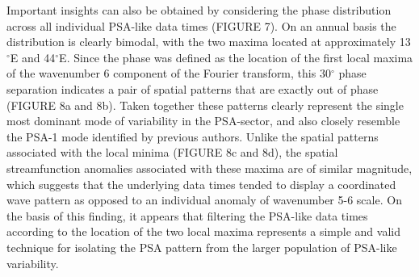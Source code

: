 Important insights can also be obtained by considering the phase distribution across all individual PSA-like data times (FIGURE 7). On an annual basis the distribution is clearly bimodal, with the two maxima located at approximately 13$^{\circ}$E and 44$^{\circ}$E. Since the phase was defined as the location of the first local maxima of the wavenumber 6 component of the Fourier transform, this 30$^{\circ}$ phase separation indicates a pair of spatial patterns that are exactly out of phase (FIGURE 8a and 8b). Taken together these patterns clearly represent the single most dominant mode of variability in the PSA-sector, and also closely resemble the PSA-1 mode identified by previous authors. Unlike the spatial patterns associated with the local minima (FIGURE 8c and 8d), the spatial streamfunction anomalies associated with these maxima are of similar magnitude, which suggests that the underlying data times tended to display a coordinated wave pattern as opposed to an individual anomaly of wavenumber 5-6 scale. On the basis of this finding, it appears that filtering the PSA-like data times according to the location of the two local maxima represents a simple and valid technique for isolating the PSA pattern from the larger population of PSA-like variability. 









